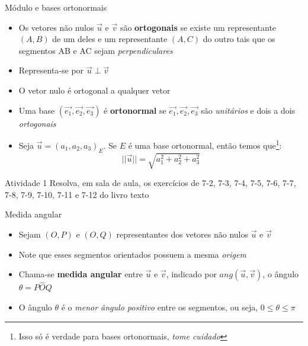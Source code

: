 \begin{frame}{Módulo e bases ortonormais}
    \begin{itemize}
        \item Os vetores não nulos \(\vec{u}\) e \(\vec{v}\) são \textbf{ortogonais} se existe um representante
            \((A,B)\) de um deles e um representante \((A,C)\) do outro tais que os segmentos AB e AC sejam
            \textit{perpendiculares}
        \item Representa-se por \(\vec{u} \perp \vec{v}\)
        \item O vetor nulo é ortogonal a qualquer vetor
        \item Uma base \((\vec{e_1},\vec{e_2},\vec{e_3})\) é \textbf{ortonormal} se \(\vec{e_1},\vec{e_2},\vec{e_3}\)
            são \textit{unitários} e dois a dois \textit{ortogonais}
        \item Seja \(\vec{u}=(a_1,a_2,a_3)_E\). Se \(E\) é uma base ortonormal, então temos
            que\footnote{Isso só é verdade para bases ortonormais, \textit{tome cuidado}}:
            \[
                ||\vec{u}||=\sqrt{a_1^2+a_2^2+a_3^2}
            \]

    \end{itemize}
\end{frame}

\begin{frame}{Atividade 1}
    Resolva, em sala de aula, os exercícios de 7-2, 7-3, 7-4, 7-5, 7-6, 7-7, 7-8, 7-9, 7-10, 7-11 e 7-12 do livro texto
\end{frame}

\begin{frame}{Medida angular}
    \begin{itemize}
        \item Sejam \((O,P)\) e \((O,Q)\) representantes dos vetores não nulos \(\vec{u}\) e \(\vec{v}\)
        \item Note que esses segmentos orientados possuem a mesma \textit{origem}
        \item Chama-se \textbf{medida angular} entre \(\vec{u}\) e \(\vec{v}\), indicado por \(ang(\vec{u},\vec{v})\), o ângulo \(\theta=P\hat{O}Q\)
        \item O ângulo \(\theta\) é o \textit{menor ângulo positivo} entre os segmentos, ou seja, \( 0 \leq \theta \leq \pi\)
    \end{itemize}

    \begin{center}
    \end{center}

\end{frame}

